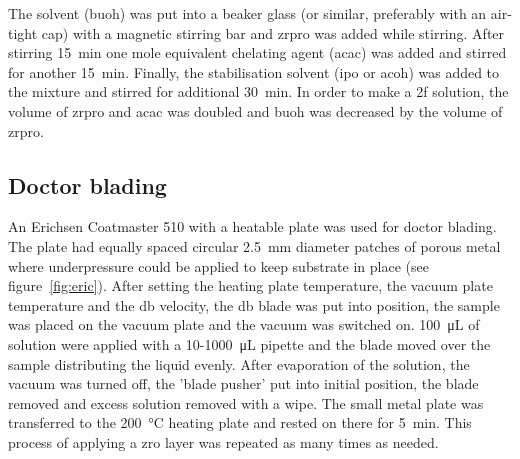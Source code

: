 \documentclass[a4paper]{article}
\newcommand{\ds}[1]{}
\newcommand{\ul}[1]{\SI{#1}{\micro\liter}}
\newcommand{\minutes}[1]{\SI{#1}{\minute}}
\begin{document}
The solvent (\gls{buoh}) was put into a beaker glass (or similar, preferably with an 
air-tight cap) with a magnetic stirring bar and \gls{zrpro} was added while stirring. After 
stirring \minutes{\ds{10 to }15} one mole equivalent chelating agent (\gls{acac}) was 
added and stirred for another \minutes{\ds{10 to }15}. Finally, the stabilisation 
solvent\cite{Hu2016} (\gls{ipo} or \gls{acoh}) was added to the mixture and stirred for 
additional \minutes{\ds{20-}30}. 
In order to make a \gls{2f} solution, the volume of \gls{zrpro} and \gls{acac} was 
doubled and \gls{buoh} was decreased by the volume of \gls{zrpro}. 

\subsection{Doctor blading}
\label{sec:DB}
An Erichsen Coatmaster 510 with a heatable plate was used for doctor blading. The plate 
had equally spaced circular \SI{2.5}{\milli\meter} diameter patches of porous metal where 
underpressure could be applied to keep substrate in place (see 
figure~\ref{fig:eric}). After setting the heating plate temperature, the vacuum plate 
temperature and the \gls{db} velocity, the \gls{db} blade 
was put into position, the sample was placed on the vacuum plate and the vacuum was 
switched on. %
\ul{100} of solution were 
applied with a 10-\ul{1000} pipette and the blade moved over the sample distributing the 
liquid evenly. After evaporation of the solution, the vacuum was turned off, the 'blade 
pusher' put into initial position, the blade removed and excess solution removed with a 
wipe. The small metal plate was transferred to the \SI{200}{\celsius} heating plate and 
rested on there for \minutes{5}. 
This process of applying a \gls{zro} layer was repeated as many times as needed.
\end{document}
